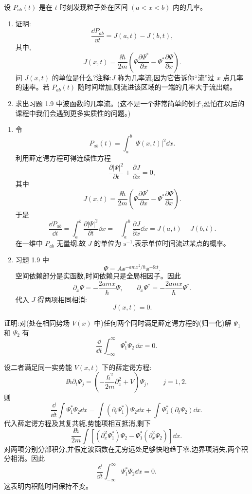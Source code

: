 \begin{question}
设 $P_{ab}(t)$ 是在 $t$ 时刻发现粒子处在区间 $(a<x<b)$ 内的几率。
\begin{enumerate}
\item 证明:
\[
\frac{\dd P_{ab}}{\dd t}=J(a,t)-J(b,t),
\]
其中,
\[
J(x,t)=\frac{\ii\hbar}{2m}\left(\Psi\frac{\partial\Psi^*}{\partial x}-\Psi^*\frac{\partial\Psi}{\partial x}\right).
\]
问 $J(x,t)$ 的单位是什么?注释:$J$ 称为几率流,因为它告诉你“流”过 $x$ 点几率的速率。若 $P_{ab}(t)$ 随时间增加,则流进该区域的一端的几率大于流出端。
\item 求出习题 1.9 中波函数的几率流。(这不是一个非常简单的例子,恐怕在以后的课程中我们会遇到更多实质性的问题。)
\end{enumerate}
\begin{solution}
\begin{enumerate}
\item 令
\[
P_{ab}(t)=\int_a^b |\Psi(x,t)|^2\dd x.
\]
利用薛定谔方程可得连续性方程
\[
\frac{\partial |\Psi|^2}{\partial t}+\frac{\partial J}{\partial x}=0,
\]
其中
\[
J(x,t)=\frac{\ii\hbar}{2m}\left(\Psi\frac{\partial\Psi^*}{\partial x}
-\Psi^*\frac{\partial\Psi}{\partial x}\right).
\]
于是
\[
\frac{\dd P_{ab}}{\dd t}=\int_a^b\frac{\partial |\Psi|^2}{\partial t}\dd x
=-\int_a^b\frac{\partial J}{\partial x}\dd x
=J(a,t)-J(b,t).
\]
在一维中 $P_{ab}$ 无量纲,故 $J$ 的单位为 $\mathrm{s}^{-1}$,表示单位时间流过某点的概率。
\item 习题 1.9 中
\[
\Psi=A\ee^{-amx^2/\hbar}\ee^{-\ii at}.
\]
空间依赖部分是实函数,时间依赖只是全局相因子。因此
\[
\partial_x\Psi=-\frac{2amx}{\hbar}\Psi,
\qquad
\partial_x\Psi^*=-\frac{2amx}{\hbar}\Psi^*.
\]
代入 $J$ 得两项相同相消:
\[
J(x,t)=0.
\]
\end{enumerate}
\end{solution}
\end{question}

\begin{question}
证明:对(处在相同势场 $V(x)$ 中)任何两个同时满足薛定谔方程的(归一化)解 $\Psi_1$ 和 $\Psi_2$ 有
\[
\frac{\dd}{\dd t}\int_{-\infty}^{\infty}\Psi_1^*\Psi_2\,\dd x=0.
\]
\begin{solution}
设二者满足同一实势能 $V(x,t)$ 下的薛定谔方程:
\[
\ii\hbar\partial_t\Psi_j=\left(-\frac{\hbar^2}{2m}\partial_x^2+V\right)\Psi_j,
\qquad j=1,2.
\]
则
\[
\frac{\dd}{\dd t}\int\Psi_1^*\Psi_2\dd x
=\int (\partial_t\Psi_1^*)\Psi_2\dd x+
\int\Psi_1^*(\partial_t\Psi_2)\dd x.
\]
代入薛定谔方程及其复共轭,势能项相互抵消,剩下
\[
\frac{\ii\hbar}{2m}\int \left[(\partial_x^2\Psi_1^*)\Psi_2-
\Psi_1^*(\partial_x^2\Psi_2)\right]\dd x.
\]
对两项分别分部积分,并假定波函数在无穷远处足够快地趋于零,边界项消失,两个积分相消。因此
\[
\frac{\dd}{\dd t}\int_{-\infty}^{\infty}\Psi_1^*\Psi_2\dd x=0.
\]
这表明内积随时间保持不变。
\end{solution}
\end{question}

